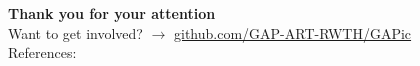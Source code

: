 \documentclass{beamer}
\numberwithin{equation}{aufgabe}
\begin{document}
\begin{frame}
    \textbf{\Large Thank you for your attention}\\ 
    \bigskip
    Want to get involved? $\xrightarrow{}$ \url{github.com/GAP-ART-RWTH/GAPic}\\
    \bigskip
    References:\\
    \printbibliography
\end{frame}
\end{document}
